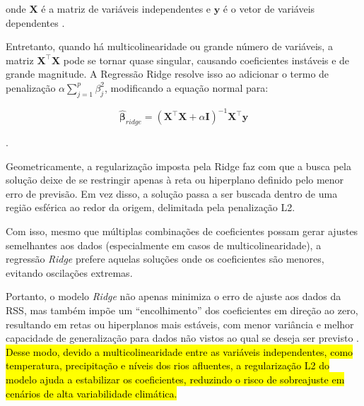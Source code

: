 \noindent onde $\mathbf{X}$ é a matriz de variáveis independentes e $\mathbf{y}$ é o vetor de variáveis dependentes \cite{montgomery2012}.

Entretanto, quando há multicolinearidade ou grande número de variáveis, a matriz $\mathbf{X}^\top \mathbf{X}$  pode se tornar quase singular, causando coeficientes instáveis e de grande magnitude. A Regressão Ridge resolve isso ao adicionar o termo de penalização $\alpha \sum_{j=1}^{p}\beta_{j}^2$, modificando a equação normal para:

\begin{equation}
	\hat{\boldsymbol\beta}_{ridge} = (\mathbf{X}^\top \mathbf{X} + \alpha \mathbf{I})^{-1} \mathbf{X}^\top \mathbf{y}
\end{equation}

\noindent \cite{ScikitLearnRidge2025}.

Geometricamente, a regularização imposta pela Ridge faz com que a busca pela solução deixe de se restringir apenas à reta ou hiperplano definido pelo menor erro de previsão. Em vez disso, a solução passa a ser buscada dentro de uma região esférica ao redor da origem, delimitada pela penalização L2.

Com isso, mesmo que múltiplas combinações de coeficientes possam gerar ajustes semelhantes aos dados (especialmente em casos de multicolinearidade), a regressão \textit{Ridge} prefere aquelas soluções onde os coeficientes são menores, evitando oscilações extremas.

Portanto, o modelo \textit{Ridge} não apenas minimiza o erro de ajuste aos dados da \gls{RSS}, mas também impõe um “encolhimento” dos coeficientes em direção ao zero, resultando em retas ou hiperplanos mais estáveis, com menor variância e melhor capacidade de generalização para dados não vistos ao qual se deseja ser previsto \cite{McDonald:2009:RR}. \hl{Desse modo, devido a multicolinearidade entre as variáveis independentes, como temperatura, precipitação e níveis dos rios afluentes, a regularização L2 do modelo ajuda a estabilizar os coeficientes, reduzindo o risco de sobreajuste em cenários de alta variabilidade climática.}